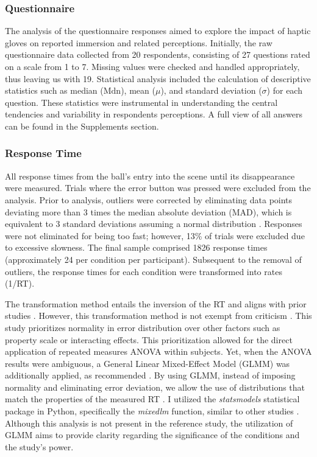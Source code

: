 \documentclass[12pt,oneside,openright]{report}
\begin{document}
\subsubsection*{Questionnaire}
The analysis of the questionnaire responses aimed to explore the impact of haptic gloves on reported immersion and related perceptions. Initially, the raw questionnaire data collected from 20 respondents, consisting of 27 questions rated on a scale from 1 to 7. Missing values were checked and handled appropriately, thus leaving us with 19. Statistical analysis included the calculation of descriptive statistics such as median ($\text{Mdn}$), mean ($\mu$), and standard deviation ($\sigma$) for each question. These statistics were instrumental in understanding the central tendencies and variability in respondents perceptions. A full view of all answers can be found in the Supplements section. 

\subsubsection*{Response Time}

All response times from the ball's entry into the scene until its disappearance were measured. Trials where the error button was pressed were excluded from the analysis. Prior to analysis, outliers were corrected by eliminating data points deviating more than 3 times the median absolute deviation (MAD), which is equivalent to 3 standard deviations assuming a normal distribution \parencite{Innes2019ACA}. Responses were not eliminated for being too fast; however, 13\% of trials were excluded due to excessive slowness. The final sample comprised 1826 response times (approximately 24 per condition per participant). Subsequent to the removal of outliers, the response times for each condition were transformed into rates (1/RT).

The transformation method entails the inversion of the RT and aligns with prior studies \parencite{Innes2019ACA}. However, this transformation method is not exempt from criticism \parencite{Lo2015-fv}. This study prioritizes normality in error distribution over other factors such as property scale or interacting effects. This prioritization allowed for the direct application of repeated measures ANOVA within subjects. Yet, when the ANOVA results were ambiguous, a General Linear Mixed-Effect Model (GLMM) was additionally applied, as recommended \parencite{Lo2015-fv}. By using GLMM, instead of imposing normality and eliminating error deviation, we allow the use of distributions that match the properties of the measured RT \parencite{Lo2015-fv}. I utilized the \textit{statsmodels} statistical package in Python, specifically the \textit{mixedlm} function, similar to other studies \parencite{RSE_FBI}. Although this analysis is not present in the reference study, the utilization of GLMM aims to provide clarity regarding the significance of the conditions and the study's power.
\end{document}
